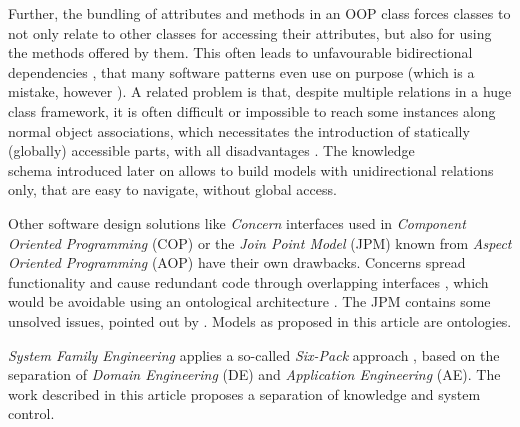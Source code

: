 Further, the bundling of attributes and methods in an OOP class forces classes
to not only relate to other classes for accessing their attributes, but also
for using the methods offered by them. This often leads to unfavourable
bidirectional dependencies \cite{heller2005}, that many software patterns even
use on purpose (which is a mistake, however \cite{heller2005}). A related
problem is that, despite multiple relations in a huge class framework, it is
often difficult or impossible to reach some instances along normal object
associations, which necessitates the introduction of statically (globally)
accessible parts, with all disadvantages \cite{heller2005}. The knowledge\\
schema introduced later on allows to build models with unidirectional relations
only, that are easy to navigate, without global access.

Other software design solutions like \emph{Concern} interfaces used in
\emph{Component Oriented Programming} (COP) \cite{avalon} or the
\emph{Join Point Model} (JPM) known from \emph{Aspect Oriented Programming}
(AOP) \cite{aspectj} have their own drawbacks. Concerns spread functionality
and cause redundant code through overlapping interfaces \cite{heller2002},
which would be avoidable using an ontological architecture \cite{hellerkunze}.
The JPM contains some unsolved issues, pointed out by \cite{huttenhuis}. Models
as proposed in this article are ontologies.

\emph{System Family Engineering} applies a so-called \emph{Six-Pack} approach
\cite{domainengg, esaps}, based on the separation of \emph{Domain Engineering}
(DE) and \emph{Application Engineering} (AE). The work described in this
article proposes a separation of knowledge and system control.
